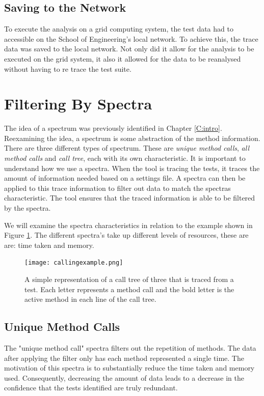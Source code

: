 \subsection{Saving to the Network}
To execute the analysis on a grid computing system, the test data had to accessible on the School of Engineering's local network. To achieve this, the trace data was saved to the local network. Not only did it allow for the analysis to be executed on the grid system, it also it allowed for the data to be reanalysed without having to re trace the test suite. 

\section{Filtering By Spectra }
\label{S:spectra}
The idea of a spectrum was previously identified in Chapter \ref{C:intro}. Reexamining the idea, a spectrum is some abstraction of the method information. There are three different types of spectrum. These are \textit{unique method calls}, \textit{all method calls} and \textit{call tree}, each with its own characteristic. It is important to understand how we use a spectra. When the tool is tracing the tests, it traces the amount of information needed based on a settings file. A spectra can then be applied to this trace information to filter out data to match the spectras characteristic. The tool ensures that the traced information is able to be filtered by the spectra. 

We will examine the spectra characteristics in relation to the example shown in Figure \ref{fig:callingexample}. The different spectra's take up different levels of resources, these are are: time taken and memory. 


\begin{figure}[h]
\begin{center}
\texttt{[image: callingexample.png]}
\end{center}
\caption{A simple representation of a call tree of three that is traced from a test. Each letter represents a method call and the bold letter is the active method in each line of the call tree.}
\label{fig:callingexample}
\end{figure}

\subsection{Unique Method Calls}
The "unique method call" spectra filters out the repetition of methods. The data after applying the filter only has each method represented a single time. The motivation of this spectra is to substantially reduce the time taken and memory used. Consequently, decreasing the amount of data leads to a decrease in the confidence that the tests identified are truly redundant. 

